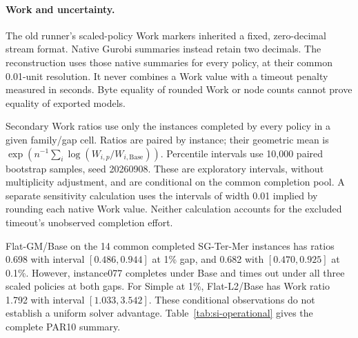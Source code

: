 \documentclass[11pt]{article}
\begin{document}
\paragraph{Work and uncertainty.}
The old runner's scaled-policy Work markers inherited a fixed, zero-decimal stream
format. Native Gurobi summaries instead retain two decimals. The reconstruction uses
those native summaries for every policy, at their common 0.01-unit resolution. It
never combines a Work value with a timeout penalty measured in seconds. Byte equality
of rounded Work or node counts cannot prove equality of exported models.

Secondary Work ratios use only the instances completed by every policy in a given
family/gap cell. Ratios are paired by instance; their geometric mean is
$\exp(n^{-1}\sum_i\log(W_{i,p}/W_{i,\mathrm{Base}}))$. Percentile intervals use
10,000 paired bootstrap samples, seed 20260908. These are exploratory intervals,
without multiplicity adjustment, and are conditional on the common completion pool.
A separate sensitivity calculation uses the intervals of width 0.01 implied by
rounding each native Work value. Neither calculation accounts for the excluded
timeout's unobserved completion effort.

Flat-GM/Base on the 14 common completed SG-Ter-Mer instances has ratios 0.698
with interval $[0.486,0.944]$ at 1\% gap, and 0.682 with $[0.470,0.925]$ at
0.1\%. However, instance077 completes under Base and times out under all three
scaled policies at both gaps. For Simple at 1\%, Flat-L2/Base has Work ratio 1.792
with interval $[1.033,3.542]$. These conditional observations do not establish a
uniform solver advantage. Table~\ref{tab:si-operational} gives the complete PAR10 summary.

\begin{table}[tb]
\centering\small
\caption{Reconstructed operational campaign. Arithmetic mean PAR10 in seconds on the
15 assigned instances per cell; a timeout contributes 18,000 seconds. Parentheses give
completed runs. All rows concern Gurobi.}\label{tab:si-operational}

\end{table}
\end{document}
